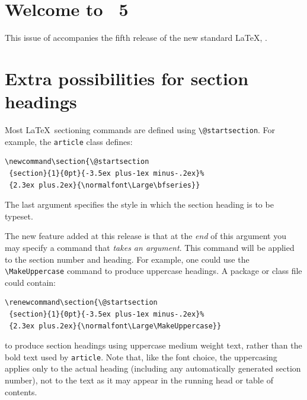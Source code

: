 \documentclass{ltnews}
\providecommand\cls[1]{\texttt{#1}}
\begin{document}
\maketitle

\section{Welcome to \LaTeXNews~5}
This issue of \emph{\LaTeXNews} accompanies the fifth release of the
new standard \LaTeX{}, \LaTeXe.

\section{Extra possibilities for section headings}
Most \LaTeX\ sectioning commands are defined using
\verb|\@startsection|.
For example, the \cls{article} class defines:
\begin{small}
\begin{verbatim}
\newcommand\section{\@startsection
 {section}{1}{0pt}{-3.5ex plus-1ex minus-.2ex}%
 {2.3ex plus.2ex}{\normalfont\Large\bfseries}}
\end{verbatim}
\end{small}
The last argument specifies the style in which the section heading is
to be typeset.

The new feature added at this release is that at the \emph{end} of
this argument you may specify a command that \emph{takes an argument}.
This command will be applied to the section number and heading.
For example, one could use the \verb|\MakeUppercase| command to
produce uppercase headings. A package or class file could contain:
\begin{small}
\begin{verbatim}
\renewcommand\section{\@startsection
 {section}{1}{0pt}{-3.5ex plus-1ex minus-.2ex}%
 {2.3ex plus.2ex}{\normalfont\Large\MakeUppercase}}
\end{verbatim}
\end{small}
to produce section headings using uppercase medium weight text, rather
than the bold text used by \cls{article}. Note that, like the font
choice, the uppercasing applies only to the actual heading (including
any automatically generated section number), not to the text as it may
appear in the running head or table of contents.
\end{document}
